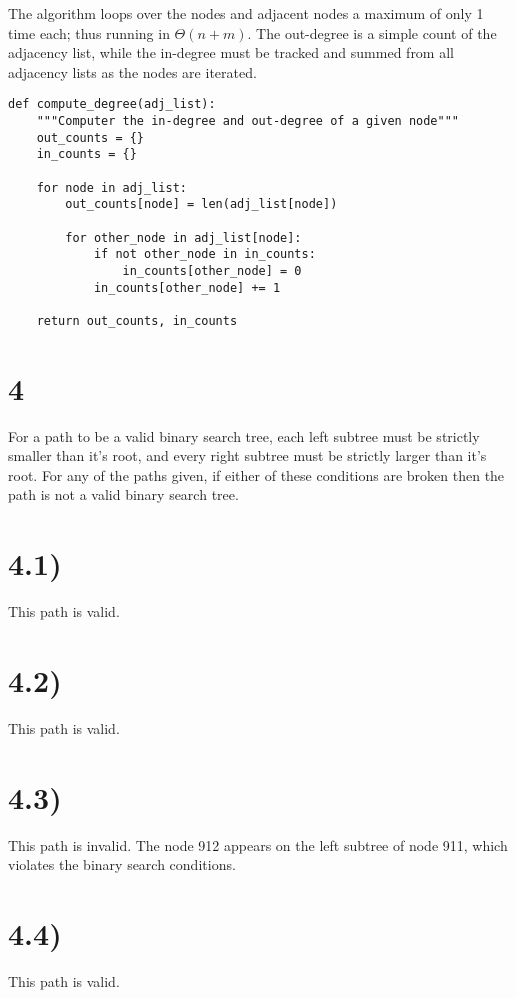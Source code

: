 \documentclass[a4paper,11pt]{article}
\begin{document}
The algorithm loops over the nodes and adjacent nodes a maximum of only 1 time each; thus running in $\Theta(n + m)$.  
The out-degree is a simple count of the adjacency list, while the in-degree must be tracked and summed from all adjacency lists 
as the nodes are iterated.

\begin{verbatim}
def compute_degree(adj_list):
    """Computer the in-degree and out-degree of a given node"""
    out_counts = {}
    in_counts = {}
    
    for node in adj_list:
        out_counts[node] = len(adj_list[node])
        
        for other_node in adj_list[node]:
            if not other_node in in_counts:
                in_counts[other_node] = 0
            in_counts[other_node] += 1
            
    return out_counts, in_counts
\end{verbatim}


\section*{4}
For a path to be a valid binary search tree, each left subtree must be strictly smaller than it's root, and every right subtree must
be strictly larger than it's root.  For any of the paths given, if either of these conditions are broken then the path is not a 
valid binary search tree.

\section*{4.1)} 
This path is valid.

\section*{4.2)} 
This path is valid.

\section*{4.3)} 
This path is invalid.  The node 912 appears on the left subtree of node 911, which violates the binary search conditions.

\section*{4.4)} 
This path is valid.
\end{document}

